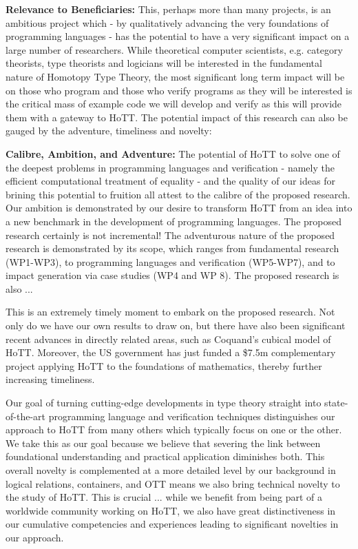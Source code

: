 \documentclass[a4paper,11pt]{article}
\begin{document}
\vspace*{-0.1in}


{\bf Relevance to Beneficiaries:} This, perhaps more than many
projects, is an ambitious project which - by qualitatively advancing
the very foundations of programming languages - has the potential to
have a very significant impact on a large number of researchers. While
theoretical computer scientists, e.g. category theorists, type
theorists and logicians will be interested in the fundamental nature
of Homotopy Type Theory, the most significant long term impact will be
on those who program and those who verify programs as they will be
interested is the critical mass of example code we will develop and
verify as this will provide them with a gateway to HoTT. The potential
impact of this research can also be gauged by the adventure,
timeliness and novelty:

{\bf Calibre, Ambition, and Adventure:} The potential of HoTT to solve
one of the deepest problems in programming languages and verification
- namely the efficient computational treatment of equality - and the
quality of our ideas for brining this potential to fruition all attest
to the calibre of the proposed research. Our ambition is demonstrated
by our desire to transform HoTT from an idea into a new
benchmark in the development of programming languages. The proposed
research certainly is not incremental! The adventurous nature of the
proposed research is demonstrated by its scope, which ranges from
fundamental research (WP1-WP3), to programming languages and
verification (WP5-WP7), and to impact generation via case studies (WP4 and
WP 8). The proposed research is also ...

 This is an extremely timely moment to
embark on the proposed research. Not only do we have our own results
to draw on, but there have also been significant recent advances in
directly related areas, such as Coquand's cubical model of HoTT.
Moreover, the US government has just funded a \$7.5m complementary
project applying HoTT to the foundations of mathematics, thereby
further increasing timeliness.

Our goal of turning cutting-edge developments in type theory straight
into state-of-the-art programming language and verification techniques
distinguishes our approach to HoTT from many others which typically
focus on one or the other. We take this as our goal because we believe
that severing the link between foundational understanding and
practical application diminishes both. This overall novelty is
complemented at a more detailed level by our background in logical
relations, containers, and OTT means we also bring technical novelty
to the study of HoTT. This is crucial ... while we benefit from being
part of a worldwide community working on HoTT, we also have great
distinctiveness in our cumulative competencies and experiences leading to 
significant novelties in our approach.
 
\end{document}
